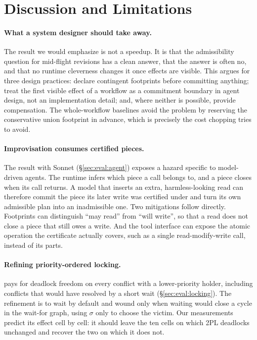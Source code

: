 \section{Discussion and Limitations}
\label{sec:discussion}

\paragraph{What a system designer should take away.}
The result we would emphasize is not a speedup. It is that the admissibility
question for mid-flight revisions has a clean answer, that the answer is often
no, and that no runtime cleverness changes it once effects are visible. This
argues for three design practices: declare contingent footprints before
committing anything; treat the first visible effect of a workflow as a
commitment boundary in agent design, not an implementation detail; and, where
neither is possible, provide compensation. The whole-workflow baselines avoid
the problem by reserving the conservative union footprint in advance, which is
precisely the cost chopping tries to avoid.

\paragraph{Improvisation consumes certified pieces.}
The  result with Sonnet (\S\ref{sec:eval:agent}) exposes a
hazard specific to model-driven agents. The runtime infers which piece a call
belongs to, and a piece closes when its call returns. A model that inserts an
extra, harmless-looking read can therefore commit the piece its later write
was certified under and turn its own admissible plan into an inadmissible
one. Two mitigations follow directly. Footprints can distinguish ``may read''
from ``will write'', so that a read does not close a piece that still owes a
write. And the tool interface can expose the atomic operation the certificate
actually covers, such as a single read-modify-write call, instead of its
parts.

\paragraph{Refining priority-ordered locking.}
\ccs pays for deadlock freedom on every conflict with a lower-priority holder,
including conflicts that would have resolved by a short wait
(\S\ref{sec:eval:locking}). The refinement is to wait by default and wound
only when waiting would close a cycle in the wait-for graph, using $\sigma$
only to choose the victim. Our measurements predict its effect cell by cell:
it should leave the ten cells on which 2PL deadlocks unchanged and recover the
two on which it does not.

